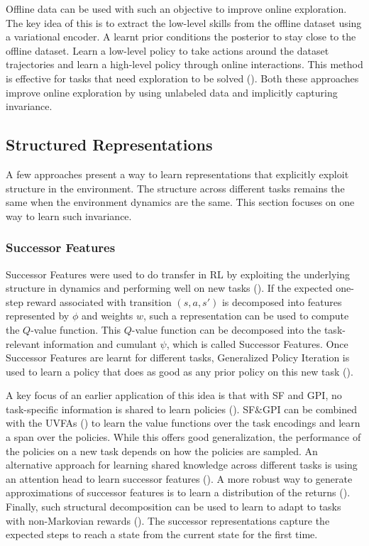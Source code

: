 \documentclass{article}
\begin{document}
Offline data can be used with such an objective to improve online exploration. The key idea of this is to extract the low-level skills from the offline dataset using a variational encoder. A learnt prior conditions the posterior to stay close to the offline dataset. Learn a low-level policy to take actions around the dataset trajectories and learn a high-level policy through online interactions. This method is effective for tasks that need exploration to be solved (\cite{wilcoxson2024leveraging}). Both these approaches improve online exploration by using unlabeled data and implicitly capturing invariance.

\subsection{Structured Representations}
A few approaches present a way to learn representations that explicitly exploit structure in the environment. The structure across different tasks remains the same when the environment dynamics are the same. This section focuses on one way to learn such invariance. 

\subsubsection{Successor Features}
Successor Features were used to do transfer in RL by exploiting the underlying structure in dynamics and performing well on new tasks (\cite{barreto2017successor}). If the expected one-step reward associated with transition $(s, a, s')$ is decomposed into features represented by $\phi$ and weights $w$, such a representation can be used to compute the $Q$-value function. This $Q$-value function can be decomposed into the task-relevant information and cumulant $\psi$, which is called Successor Features. Once Successor Features are learnt for different tasks, Generalized Policy Iteration is used to learn a policy that does as good as any prior policy on this new task (\cite{barreto2017successor}). 

A key focus of an earlier application of this idea is that with SF and GPI, no task-specific information is shared to learn policies (\cite{borsa2018universal}). SF$\&$GPI can be combined with the UVFAs (\cite{schaul2015universal}) to learn the value functions over the task encodings and learn a span over the policies. While this offers good generalization, the performance of the policies on a new task depends on how the policies are sampled. An alternative approach for learning shared knowledge across different tasks is using an attention head to learn successor features (\cite{carvalho2023composing}). A more robust way to generate approximations of successor features is to learn a distribution of the returns (\cite{carvalho2023combining}). Finally, such structural decomposition can be used to learn to adapt to tasks with non-Markovian rewards (\cite{moskovitz2021first}). The successor representations capture the expected steps to reach a state from the current state for the first time. 
\end{document}
